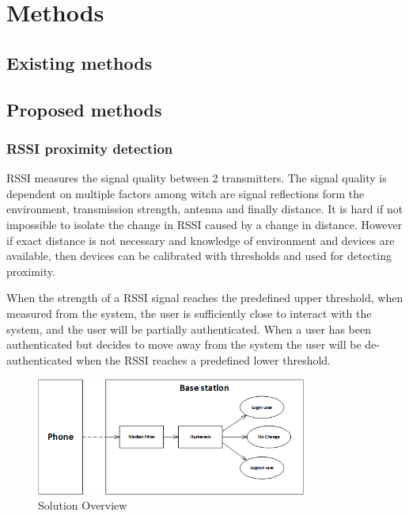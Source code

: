 \section{Methods}

\subsection{Existing methods}

\subsection{Proposed methods}

\subsubsection{RSSI proximity detection}


RSSI measures the signal quality between 2 transmitters.
The signal quality is dependent on multiple factors among witch are signal reflections form the environment, transmission strength, antenna and finally distance.
It is hard if not impossible to isolate the change in RSSI caused by a change in distance.
However if exact distance is not necessary and knowledge of environment and devices are available, then devices can be calibrated with thresholds and used for detecting proximity.


When the strength of a RSSI signal reaches the predefined upper threshold, when measured from the system, the user is sufficiently close to interact with the system, and the user will be partially authenticated.
When a user has been authenticated but decides to move away from the system the user will be de-authenticated when the RSSI reaches a predefined lower threshold.

\begin{figure}[!t]
	\centering
	\includegraphics[width=3.5in]{img/SolutionOverview}
	\caption{ Solution Overview }
	\label{fig_solution_overview}
\end{figure}

